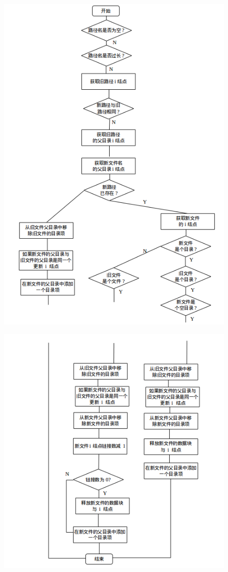 \documentclass[nofonts]{ctexart}
\begin{document}
\begin{itemize}
  \includegraphics[width=12cm]{./images/./rename_1.png}

  \includegraphics[width=12cm]{./images/./rename_2.png}
  \end{itemize}
\end{document}
